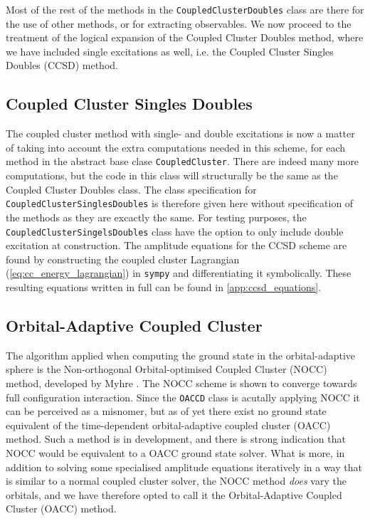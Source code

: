     Most of the rest of the methods in the \lstinline{CoupledClusterDoubles} class are there 
    for the use of other methods, or for extracting observables. We now proceed to the 
    treatment of the logical expansion of the Coupled Cluster 
    Doubles method, where we have included single excitations as well,
    i.e. the Coupled Cluster Singles Doubles (CCSD) method.

    \subsection{Coupled Cluster Singles Doubles}

    \begin{figure}[h]
    
    \end{figure}

    The coupled cluster method with single- and double 
    excitations is now a matter of taking into account the extra computations needed in 
    this scheme, for each method in the abstract base clase \lstinline{CoupledCluster}. 
    There are indeed many more computations, but the code in this class will structurally
    be the same as the Coupled Cluster Doubles class. 
    The class specification for \lstinline{CoupledClusterSinglesDoubles} is therefore 
    given here without specification of the methods as they are excactly the same. For testing 
    purposes, the \lstinline{CoupledClusterSingelsDoubles} class have the option 
    to only include double excitation at construction. The amplitude equations for 
    the CCSD scheme are found by constructing the coupled cluster Lagrangian
    (\autoref{eq:cc_energy_lagrangian}) in \lstinline{sympy} and differentiating 
    it symbolically. These resulting equations written in full can be found
    in \autoref{app:ccsd_equations}.

    \subsection{Orbital-Adaptive Coupled Cluster}

    \begin{figure}
    
    \end{figure}

    The algorithm applied when computing the ground state in the orbital-adaptive sphere 
    is the Non-orthogonal Orbital-optimised Coupled Cluster (NOCC) method, developed by 
    Myhre \cite{myhre2018demonstrating}. The NOCC scheme is shown to converge towards full
    configuration interaction. Since the \lstinline{OACCD} class is acutally applying 
    NOCC it can be perceived as a misnomer, but as of yet there exist no ground state 
    equivalent of the time-dependent 
    orbital-adaptive coupled cluster (OACC) method. Such a method is in development, and there
    is strong indication that NOCC would be equivalent to a OACC ground state solver. 
    What is more, in addition to solving some specialised amplitude equations iteratively in 
    a way that is similar to a normal coupled cluster solver,
    the NOCC method \emph{does} vary the orbitals, and we have therefore 
    opted to call it the Orbital-Adaptive Coupled Cluster (OACC) method.

